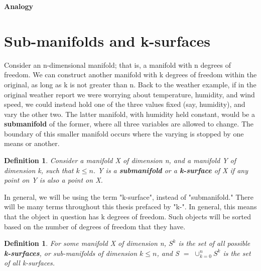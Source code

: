 \documentclass{book}
\newtheorem{defn}[equation]{Definition}
\begin{document}
\textbf{Analogy }

\section{Sub-manifolds and k-surfaces}

Consider an n-dimensional manifold; that is, a manifold with n degrees of freedom. We can construct another manifold with k degrees of freedom within the original, as long as k is not greater than n. Back to the weather example, if in the original weather report we were worrying about temperature, humidity, and wind speed, we could instead hold one of the three values fixed (say, humidity), and vary the other two. The latter manifold, with humidity held constant, would be a \textbf{submanifold} of the former, where all three variables are allowed to change. The boundary of this smaller manifold occurs where the varying is stopped by one means or another. 


\begin{defn}
	Consider a manifold X of dimension n, and a manifold Y of dimension k, such that $k \leq n$. Y is a \textbf{submanifold} or a \textbf{k-surface} of X if any point on Y is also a point on X. 
\end{defn}


In general, we will be using the term "k-surface", instead of "submanifold." There will be many terms throughout this thesis prefaced by "k-". In general, this means that the object in question has k degrees of freedom. Such objects will be sorted based on the number of degrees of freedom that they have.  


\begin{defn}
	For some manifold X of dimension n, $S^k$ is the set of all possible \textbf{k-surfaces}, or sub-manifolds of dimension $k \leq n$, and S $=$ $\cup^n_{k=0}S^k$ is the set of all k-surfaces. 
\end{defn}
\end{document}
